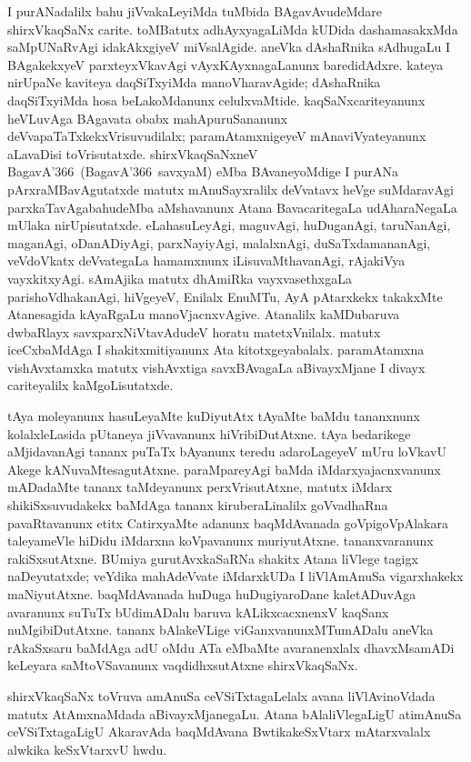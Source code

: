 I purANadalilx bahu jiVvakaLeyiMda tuMbida BAgavAvudeMdare shirxVkaqSaNx carite. toMBatutx adhAyxyagaLiMda kUDida dashamasakxMda saMpUNaRvAgi idakAkxgiyeV miVsa\-lAgide. aneVka dAshaRnika sAdhugaLu I BAgakekxyeV parxteyxVkavAgi vAyxKAyxnagaLanunx baredidAdxre. kateya nirUpaNe kaviteya daqSiTxyiMda manoVharavAgide; dAshaRnika daqSiTxyiMda hosa beLakoMdanunx celulxvaMtide. kaqSaNxcariteyanunx heVLuvAga BAga\-vata obabx mahApuruSananunx deVvapaTaTxkekxVrisuvudilalx; paramAtamxnigeyeV mAnaviVyate\-yanunx aLavaDisi toVrisutatxde. shirxVkaqSaNxneV BagavA\char'366\ (BagavA\char'366\ savxyaM) eMba BAvaneyoMdige I purANa pArxraMBavAgutatxde matutx mAnuSayxralilx deVvatavx heVge suMdaravAgi parxkaTavAgabahudeMba aMshavanunx Atana BavacaritegaLa udAharaNegaLa mUlaka nirUpisutatxde. eLahasuLeyAgi, maguvAgi, huDuganAgi, taruNanAgi, maganAgi, oDanADiyAgi, parxNayiyAgi, malalxnAgi, duSaTxdamananAgi, veVdoVkatx deVvategaLa hamamxnunx iLisuvaMthavanAgi, rAjakiVya vayxkitxyAgi. sAmAjika matutx dhAmiRka vayxvasethxgaLa parishoVdhakanAgi, hiVgeyeV, Enilalx EnuMTu, AyA pAtarxkekx takakxMte Atanesagida kAyaRgaLu manoVjacnxvAgive. Atanalilx kaMDubaruva dwbaRlayx savxparxNiVtavAdudeV horatu matetxVnilalx. matutx iceCxbaMdAga I shakitxmitiyanunx Ata kitotxgeyabalalx. paramAtamxna vishAvxtamxka matutx vishAvxtiga savxBAvagaLa aBivayxMjane I divayx cariteyalilx kaMgoLisutatxde.

tAya moleyanunx hasuLeyaMte kuDiyutAtx tAyaMte baMdu tananxnunx kolalx\-leLasida pUtaneya jiVvavanunx hiVribiDutAtxne. tAya bedarikege aMjidavanAgi tananx puTaTx bAyanunx teredu adaroLageyeV mUru loVkavU Akege kANuvaMtesagutAtxne. paraMpareyAgi baMda iMdarxyajacnxvanunx mADadaMte tananx taMdeyanunx perxVrisutAtxne, matutx iMdarx shikiSxsuvudakekx baMdAga tananx kiruberaLinalilx goVvadhaRna pavaRtavanunx etitx CatirxyaMte adanunx baqMdAvanada goVpigoVpAlakara taleyameVle hiDidu iMdarxna koVpavanunx muriyutAtxne. tananxvaranunx rakiSxsutAtxne. BUmiya gurutAvxkaSaRNa shakitx Atana liVlege tagigx naDeyutatxde; veYdika mahAdeVvate iMdarxkUDa I liVlAmAnuSa vigarxhakekx maNiyutAtxne. baqMdAvanada huDuga huDugiyaroDane kaletADuvAga avaranunx suTuTx bUdimADalu baruva kALikxcacxnenxV kaqSanx nuMgibiDutAtxne. tananx bAlakeVLige viGanxvanunxMTumADalu aneVka rAkaSxsaru baMdAga adU oMdu ATa eMbaMte avaranenxlalx dhavxMsamADi keLeyara saMtoVSavanunx vaqdidhxsutAtxne shirxVkaqSaNx.

shirxVkaqSaNx toVruva amAnuSa ceVSiTxtagaLelalx avana liVlAvinoVdada matutx AtAmxnaMdada aBivayxMjanegaLu. Atana bAlaliVlegaLigU atimAnuSa ceVSiTxtagaLigU AkaravAda baqMdAvana BwtikakeSxVtarx mAtarxvalalx alwkika keSxVtarxvU hwdu.

